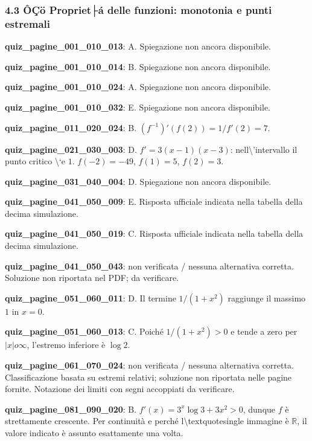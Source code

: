 \documentclass[11pt,a4paper]{article}
\newcounter{quiz}
\begin{document}
\subsubsection*{4.3 ÔÇö Propriet├á delle funzioni: monotonia e punti estremali}
\noindent\textbf{quiz\_pagine\_001\_010\_013}: A. Spiegazione non ancora disponibile.\par\medskip
\noindent\textbf{quiz\_pagine\_001\_010\_014}: B. Spiegazione non ancora disponibile.\par\medskip
\noindent\textbf{quiz\_pagine\_001\_010\_024}: A. Spiegazione non ancora disponibile.\par\medskip
\noindent\textbf{quiz\_pagine\_001\_010\_032}: E. Spiegazione non ancora disponibile.\par\medskip
\noindent\textbf{quiz\_pagine\_011\_020\_024}: B. $(f^{-1})\prime(f(2))=1/f\prime(2)=7$.\par\medskip
\noindent\textbf{quiz\_pagine\_021\_030\_003}: D. $f\prime=3(x-1)(x-3)$: nell\textbackslash{}'intervallo il punto critico \textbackslash{}`e $1$. $f(-2)=-49$, $f(1)=5$, $f(2)=3$.\par\medskip
\noindent\textbf{quiz\_pagine\_031\_040\_004}: D. Spiegazione non ancora disponibile.\par\medskip
\noindent\textbf{quiz\_pagine\_041\_050\_009}: E. Risposta ufficiale indicata nella tabella della decima simulazione.\par\medskip
\noindent\textbf{quiz\_pagine\_041\_050\_019}: C. Risposta ufficiale indicata nella tabella della decima simulazione.\par\medskip
\noindent\textbf{quiz\_pagine\_041\_050\_043}: non verificata / nessuna alternativa corretta. Soluzione non riportata nel PDF; da verificare.\par\medskip
\noindent\textbf{quiz\_pagine\_051\_060\_011}: D. Il termine $1/(1+x^2)$ raggiunge il massimo $1$ in $x=0$.\par\medskip
\noindent\textbf{quiz\_pagine\_051\_060\_013}: C. Poiché $1/(1+x^2)>0$ e tende a zero per $|x|	o\infty$, l’estremo inferiore è $\log2$.\par\medskip
\noindent\textbf{quiz\_pagine\_061\_070\_024}: non verificata / nessuna alternativa corretta. Classificazione basata su estremi relativi; soluzione non riportata nelle pagine fornite. Notazione dei limiti con segni accoppiati da verificare.\par\medskip
\noindent\textbf{quiz\_pagine\_081\_090\_020}: B. $f\prime(x)=3^x\log3+3x^2>0$, dunque $f$ è strettamente crescente. Per continuità e perché l\textbackslash{}textquotesingle immagine è $\mathbb R$, il valore indicato è assunto esattamente una volta.\par\medskip
\end{document}
